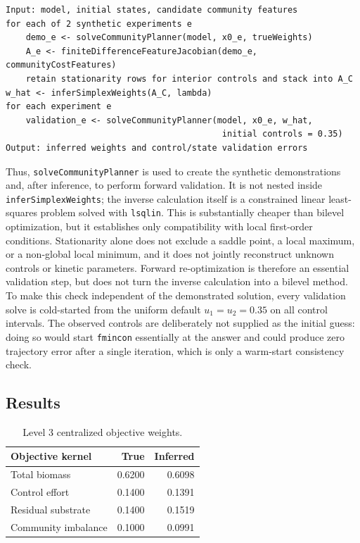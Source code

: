 \documentclass[11pt,a4paper]{article}
\begin{document}
\noindent\begin{minipage}{\linewidth}
\begin{lstlisting}[style=pseudostyle,title={Compact MATLAB pseudocode}]
Input: model, initial states, candidate community features
for each of 2 synthetic experiments e
    demo_e <- solveCommunityPlanner(model, x0_e, trueWeights)
    A_e <- finiteDifferenceFeatureJacobian(demo_e, communityCostFeatures)
    retain stationarity rows for interior controls and stack into A_C
w_hat <- inferSimplexWeights(A_C, lambda)
for each experiment e
    validation_e <- solveCommunityPlanner(model, x0_e, w_hat,
                                           initial controls = 0.35)
Output: inferred weights and control/state validation errors
\end{lstlisting}
\end{minipage}

Thus, \texttt{solveCommunityPlanner} is used to create the synthetic
demonstrations and, after inference, to perform forward validation. It is not
nested inside \texttt{inferSimplexWeights}; the inverse calculation itself is
a constrained linear least-squares problem solved with \texttt{lsqlin}. This
is substantially cheaper than bilevel optimization, but it establishes only
compatibility with local first-order conditions. Stationarity alone does not
exclude a saddle point, a local maximum, or a non-global local minimum, and it
does not jointly reconstruct unknown controls or kinetic parameters. Forward
re-optimization is therefore an essential validation step, but does not turn
the inverse calculation into a bilevel method. To make this check independent
of the demonstrated solution, every validation solve is cold-started from the
uniform default \(u_1=u_2=0.35\) on all control intervals. The observed
controls are deliberately not supplied as the initial guess: doing so would
start \texttt{fmincon} essentially at the answer and could produce zero
trajectory error after a single iteration, which is only a warm-start
consistency check.

\subsection{Results}

\begin{table}[H]
\centering
\caption{Level 3 centralized objective weights.}
\label{tab:level3}
\begin{tabular}{lrr}
\toprule
Objective kernel & True & Inferred\\
\midrule
Total biomass & 0.6200 & 0.6098\\
Control effort & 0.1400 & 0.1391\\
Residual substrate & 0.1400 & 0.1519\\
Community imbalance & 0.1000 & 0.0991\\
\bottomrule
\end{tabular}
\end{table}
\end{document}
